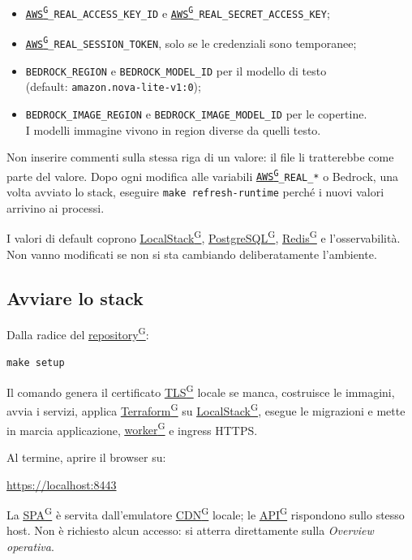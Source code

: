 \documentclass[a4paper,12pt]{article}
\providecommand{\glslink}[2]{\href{https://alittlebyte-19.github.io/Documentazione/glossario.html\#gls-#1}{\underline{#2}\textsuperscript{\scriptsize G}}}
\begin{document}
\begin{itemize}
    \item \texttt{\glslink{aws}{AWS}\_REAL\_ACCESS\_KEY\_ID} e \texttt{\glslink{aws}{AWS}\_REAL\_SECRET\_ACCESS\_KEY};
    \item \texttt{\glslink{aws}{AWS}\_REAL\_SESSION\_TOKEN}, solo se le credenziali sono temporanee;
    \item \texttt{BEDROCK\_REGION} e \texttt{BEDROCK\_MODEL\_ID} per il modello di testo\\
    (default: \texttt{amazon.nova-lite-v1:0});
    \item \texttt{BEDROCK\_IMAGE\_REGION} e \texttt{BEDROCK\_IMAGE\_MODEL\_ID} per le copertine.\\
    I modelli immagine vivono in region diverse da quelli testo.
\end{itemize}

Non inserire commenti sulla stessa riga di un valore: il file li tratterebbe come parte del valore. Dopo ogni modifica alle variabili \texttt{\glslink{aws}{AWS}\_REAL\_*} o Bedrock, una volta avviato lo stack, eseguire \texttt{make refresh-runtime} perché i nuovi valori arrivino ai processi.

I valori di default coprono \glslink{localstack}{LocalStack}, \glslink{postgresql}{PostgreSQL}, \glslink{redis}{Redis} e l'osservabilità. Non vanno modificati se non si sta cambiando deliberatamente l'ambiente.

\subsection{Avviare lo stack}

Dalla radice del \glslink{repository}{repository}:

\begin{verbatim}
make setup
\end{verbatim}

Il comando genera il certificato \glslink{tls-transport-layer-security}{TLS} locale se manca, costruisce le immagini, avvia i servizi, applica \glslink{terraform}{Terraform} su \glslink{localstack}{LocalStack}, esegue le migrazioni e mette in marcia applicazione, \glslink{worker}{worker} e ingress HTTPS.

Al termine, aprire il browser su:

\url{https://localhost:8443}

La \glslink{spa-single-page-application}{SPA} è servita dall'emulatore \glslink{cdn-content-delivery-network}{CDN} locale; le \glslink{api-application-programming-interface}{API} rispondono sullo stesso host. Non è richiesto alcun accesso: si atterra direttamente sulla \textit{Overview operativa}.
\end{document}
